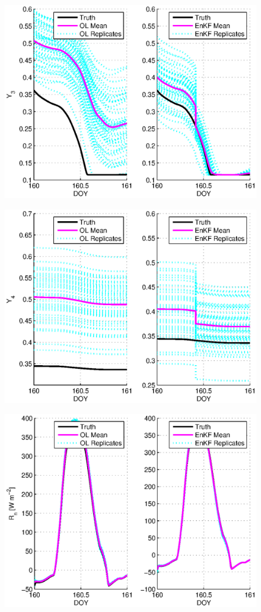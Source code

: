 \documentclass[letterpaper]{tufte-handout}
\begin{document}
\begin{figure}
  \includegraphics[width=\textwidth]{3cy3}
  \caption{}
\end{figure}
\begin{figure}
  \includegraphics[width=\textwidth]{3cy4}
  \caption{}
\end{figure}
\begin{figure}
  \includegraphics[width=\textwidth]{3cr}
  \caption{}
\end{figure}
\end{document}
